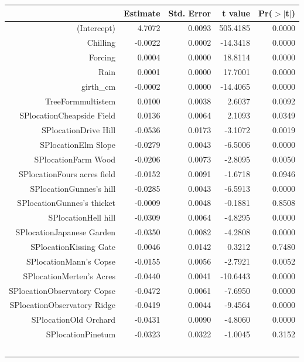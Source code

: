\begin{table}[ht]
\centering
\begin{tabular}{rrrrr}
  \hline
 & Estimate & Std. Error & t value & Pr($>$$|$t$|$) \\ 
  \hline
(Intercept) & 4.7072 & 0.0093 & 505.4185 & 0.0000 \\ 
  Chilling & -0.0022 & 0.0002 & -14.3418 & 0.0000 \\ 
  Forcing & 0.0004 & 0.0000 & 18.8114 & 0.0000 \\ 
  Rain & 0.0001 & 0.0000 & 17.7001 & 0.0000 \\ 
  girth\_cm & -0.0002 & 0.0000 & -14.4065 & 0.0000 \\ 
  TreeFormmultistem & 0.0100 & 0.0038 & 2.6037 & 0.0092 \\ 
  SPlocationCheapside Field & 0.0136 & 0.0064 & 2.1093 & 0.0349 \\ 
  SPlocationDrive Hill & -0.0536 & 0.0173 & -3.1072 & 0.0019 \\ 
  SPlocationElm Slope & -0.0279 & 0.0043 & -6.5006 & 0.0000 \\ 
  SPlocationFarm Wood & -0.0206 & 0.0073 & -2.8095 & 0.0050 \\ 
  SPlocationFours acres field & -0.0152 & 0.0091 & -1.6718 & 0.0946 \\ 
  SPlocationGunnes's hill & -0.0285 & 0.0043 & -6.5913 & 0.0000 \\ 
  SPlocationGunnes's thicket & -0.0009 & 0.0048 & -0.1881 & 0.8508 \\ 
  SPlocationHell hill & -0.0309 & 0.0064 & -4.8295 & 0.0000 \\ 
  SPlocationJapanese Garden & -0.0350 & 0.0082 & -4.2808 & 0.0000 \\ 
  SPlocationKissing Gate & 0.0046 & 0.0142 & 0.3212 & 0.7480 \\ 
  SPlocationMann's Copse & -0.0155 & 0.0056 & -2.7921 & 0.0052 \\ 
  SPlocationMerten's Acres & -0.0440 & 0.0041 & -10.6443 & 0.0000 \\ 
  SPlocationObservatory Copse & -0.0472 & 0.0061 & -7.6950 & 0.0000 \\ 
  SPlocationObservatory Ridge & -0.0419 & 0.0044 & -9.4564 & 0.0000 \\ 
  SPlocationOld Orchard & -0.0431 & 0.0090 & -4.8060 & 0.0000 \\ 
  SPlocationPinetum & -0.0323 & 0.0322 & -1.0045 & 0.3152 \\ 
$$
\end{tabular}
\end{table}
